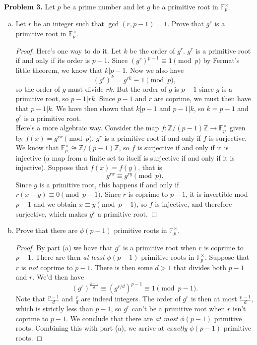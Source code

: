 \documentclass[11pt,letterpaper]{report}
\newcommand{\integers}{\mathbb{Z}}
\newcommand{\field}{\mathbb{F}}
\begin{document}
\noindent\textbf{Problem 3. }
Let $p$ be a prime number and let $g$ be a primitive root in $\field_p^\times$.
\begin{enumerate}[(a)]
	\item Let $r$ be an integer such that $\gcd(r, p-1) = 1$. Prove that $g^r$ is a primitive root in $\field_p^\times$.
	\begin{proof}
		Here's one way to do it. Let $k$ be the order of $g^r$. $g^r$ is a primitive root if and only if its order is $p-1$. Since $(g^r)^{p-1} \equiv 1\pmod{p}$ by Fermat's little theorem, we know that $k|p-1$. Now we also have
		\[
		(g^r)^k = g^{rk} \equiv 1\pmod{p},
		\]
		so the order of $g$ must divide $rk$. But the order of $g$ is $p-1$ since $g$ is a primitive root, so $p-1|rk$. Since $p-1$ and $r$ are coprime, we must then have that $p-1|k$. We have then shown that $k|p-1$ and $p-1|k$, so $k = p-1$ and $g^r$ is a primitive root.\\

		\noindent Here's a more algebraic way. Consider the map $f: \integers/(p-1)\integers\to \field_p^\times$ given by $f(x) = g^{rx}\pmod{p}$. $g^r$ is a primitive root if and only if $f$ is surjective. We know that $\field_p^\times \cong \integers/(p-1)\integers$, so $f$ is surjective if and only if it is injective (a map from a finite set to itself is surjective if and only if it is injective). Suppose that $f(x) = f(y)$, that is
		\[
		g^{rx} \equiv g^{ry}\pmod{p}.
		\]
		Since $g$ is a primitive root, this happens if and only if $r(x-y)\equiv 0\pmod{p-1}$. Since $r$ is coprime to $p-1$, it is invertible mod $p-1$ and we obtain $x \equiv y\pmod{p-1}$, so $f$ is injective, and therefore surjective, which makes $g^r$ a primitive root.
	\end{proof}

	\item Prove that there are $\phi(p-1)$ primitive roots in $\field_p^\times$.
	\begin{proof}
		By part (a) we have that $g^r$ is a primitive root when $r$ is coprime to $p-1$. There are then \textit{at least} $\phi(p-1)$ primitive roots in $\field_p^\times$. Suppose that $r$ is \textit{not} coprime to $p-1$. There is then some $d>1$ that divides both $p-1$ and $r$. We'd then have
		\[
		(g^r)^{\frac{p-1}{d}} \equiv (g^{r/d})^{p-1}\equiv 1\pmod{p-1}.
		\]
		Note that $\frac{p-1}{d}$ and $\frac{r}{d}$ are indeed integers. The order of $g^r$ is then at most $\frac{p-1}{d}$, which is strictly less than $p-1$, so $g^r$ can't be a primitive root when $r$ isn't coprime to $p-1$. We conclude that there are \textit{at most} $\phi(p-1)$ primitive roots. Combining this with part (a), we arrive at \textit{exactly} $\phi(p-1)$ primitive roots.
	\end{proof}


\end{enumerate}
\end{document}
